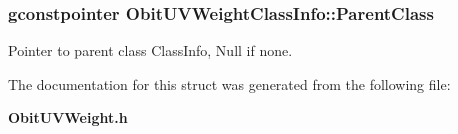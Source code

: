 \subsubsection{\setlength{\rightskip}{0pt plus 5cm}gconstpointer {\bf Obit\-UVWeight\-Class\-Info::Parent\-Class}}\label{structObitUVWeightClassInfo_o3}


Pointer to parent class Class\-Info, Null if none. 



The documentation for this struct was generated from the following file:\begin{CompactItemize}
\item 
{\bf Obit\-UVWeight.h}\end{CompactItemize}
